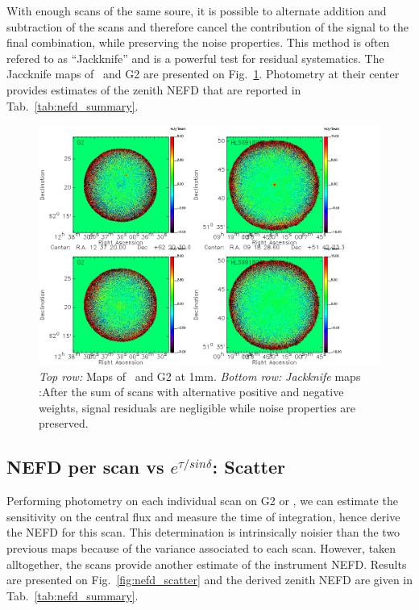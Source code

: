 With enough scans of the same soure, it is possible to alternate addition and
subtraction of the scans and therefore cancel the contribution of the signal to
the final combination, while preserving the noise properties. This method is
often refered to as ``Jackknife'' and is a powerful test for residual
systematics. The Jaccknife maps of \hls\ and G2 are presented on
Fig.~\ref{fig:jk_maps}. Photometry at their center provides estimates of the
zenith NEFD that are reported in Tab.~\ref{tab:nefd_summary}.

\begin{figure}[hhh]
\begin{center}
\includegraphics[clip, angle=0, scale=0.5]{Figures/nefd_jackknife.png}
\caption[Jackknife maps of G2 and \hls]{\emph{Top row:} Maps of \hls\ and G2 at
  1mm. \emph{Bottom row:} \emph{Jackknife} maps :After the sum of scans with alternative positive and negative
  weights, signal residuals are negligible while noise properties are preserved.}
\label{fig:jk_maps}
\end{center}
\end{figure}


\subsection{NEFD per scan vs $e^{\tau/sin\delta}$: Scatter}
\label{se:nefd_scatter}

Performing photometry on each individual scan on G2 or \hls, we can estimate the
sensitivity on the central flux and measure the time of integration, hence
derive the NEFD for this scan. This determination is intrinsically noisier than
the two previous maps because of the variance associated to each scan. However,
taken alltogether, the scans provide another estimate of the instrument
NEFD. Results are presented on Fig.~\ref{fig:nefd_scatter} and the derived
zenith NEFD are given in Tab.~\ref{tab:nefd_summary}.


